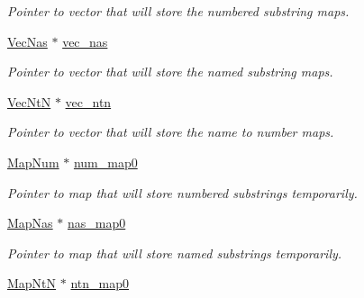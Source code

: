 \begin{DoxyCompactItemize}
\begin{DoxyCompactList}\small\item\em Pointer to vector that will store the numbered substring maps. \end{DoxyCompactList}\item 
\hyperlink{namespacejpcre2_a2b121ae776ea5b2913839f418a7d856b}{Vec\+Nas} $\ast$ \hyperlink{classjpcre2_1_1RegexMatch_a812b57dc08fdc0caa93a1b508ef8242c}{vec\+\_\+nas}\hypertarget{classjpcre2_1_1RegexMatch_a812b57dc08fdc0caa93a1b508ef8242c}{}\label{classjpcre2_1_1RegexMatch_a812b57dc08fdc0caa93a1b508ef8242c}

\begin{DoxyCompactList}\small\item\em Pointer to vector that will store the named substring maps. \end{DoxyCompactList}\item 
\hyperlink{namespacejpcre2_a88a7aaf84cad627d34c8152e726168eb}{Vec\+NtN} $\ast$ \hyperlink{classjpcre2_1_1RegexMatch_a86ef413ab6d237972af858be26ff77f7}{vec\+\_\+ntn}\hypertarget{classjpcre2_1_1RegexMatch_a86ef413ab6d237972af858be26ff77f7}{}\label{classjpcre2_1_1RegexMatch_a86ef413ab6d237972af858be26ff77f7}

\begin{DoxyCompactList}\small\item\em Pointer to vector that will store the name to number maps. \end{DoxyCompactList}\item 
\hyperlink{namespacejpcre2_a947e37f0e4a1678157e7f1f855638e82}{Map\+Num} $\ast$ \hyperlink{classjpcre2_1_1RegexMatch_a94ad930ea8cb22873737fda344bae508}{num\+\_\+map0}\hypertarget{classjpcre2_1_1RegexMatch_a94ad930ea8cb22873737fda344bae508}{}\label{classjpcre2_1_1RegexMatch_a94ad930ea8cb22873737fda344bae508}

\begin{DoxyCompactList}\small\item\em Pointer to map that will store numbered substrings temporarily. \end{DoxyCompactList}\item 
\hyperlink{namespacejpcre2_a20bd901c9ca3c949806aa6b9e324f6cf}{Map\+Nas} $\ast$ \hyperlink{classjpcre2_1_1RegexMatch_a36749947847f266de03c3991ac88a694}{nas\+\_\+map0}\hypertarget{classjpcre2_1_1RegexMatch_a36749947847f266de03c3991ac88a694}{}\label{classjpcre2_1_1RegexMatch_a36749947847f266de03c3991ac88a694}

\begin{DoxyCompactList}\small\item\em Pointer to map that will store named substrings temporarily. \end{DoxyCompactList}\item 
\hyperlink{namespacejpcre2_a753ebedfb8caf4a16ffbf47d8d705656}{Map\+NtN} $\ast$ \hyperlink{classjpcre2_1_1RegexMatch_a1c790683d023313967ce80db6045419f}{ntn\+\_\+map0}\hypertarget{classjpcre2_1_1RegexMatch_a1c790683d023313967ce80db6045419f}{}\label{classjpcre2_1_1RegexMatch_a1c790683d023313967ce80db6045419f}


\end{DoxyCompactItemize}
